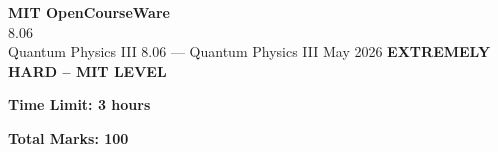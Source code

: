 \documentclass[12pt,a4paper]{exam}
\begin{document}
\begin{center}
{\LARGE \textbf{MIT OpenCourseWare}}\\8.06\\Quantum Physics III
\vspace{0.5cm}
{8.06} --- {Quantum Physics III}
\vspace{0.3cm}
May 2026
\vspace{0.3cm}
\textbf{EXTREMELY HARD -- MIT LEVEL}
\end{center}

\begin{center}
\textbf{Time Limit: 3 hours}
\end{center}

\begin{center}
\textbf{Total Marks: 100}
\end{center}

\vspace{0.5cm}
\end{document}
